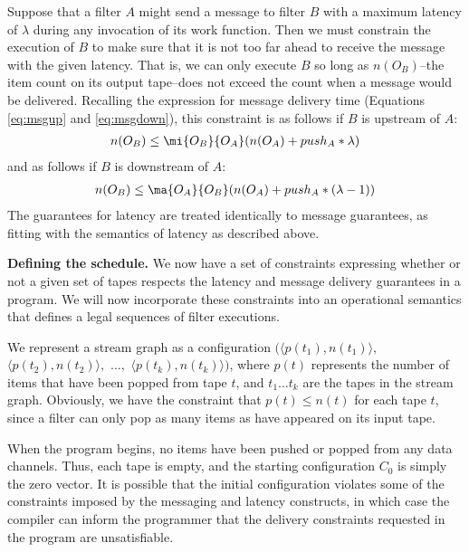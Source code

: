 Suppose that a filter $A$ might send a message to filter $B$ with a
maximum latency of $\lambda$ during any invocation of its work
function.  Then we must constrain the execution of $B$ to make sure
that it is not too far ahead to receive the message with the given
latency.  That is, we can only execute $B$ so long as $n(O_B)$--the
item count on its output tape--does not exceed the count when a
message would be delivered.  Recalling the expression for message
delivery time (Equations \ref{eq:msgup} and
\ref{eq:msgdown}), this constraint is as follows if $B$ is upstream of $A$:
\begin{align}
\label{eq:mc1}
n(O_B) \le \mi{O_B}{O_A}(n(O_A) + push_A * \lambda)
\end{align}
and as follows if $B$ is downstream of $A$:
\begin{align}
\label{eq:mc2}
n(O_B) \le \ma{O_A}{O_B}(n(O_A) + push_A * (\lambda-1))
\end{align}
The guarantees for latency are treated identically to message
guarantees, as fitting with the semantics of latency as described
above.

{\bf Defining the schedule.}  We now have a set of constraints
expressing whether or not a given set of tapes respects the latency
and message delivery guarantees in a program.  We will now
incorporate these constraints into an operational semantics that
defines a legal sequences of filter executions.  

We represent a stream graph as a configuration $(\langle p(t_1),
n(t_1) \rangle,$ $\langle p(t_2), n(t_2) \rangle,$ $\dots,$ $\langle
p(t_k), n(t_k) \rangle)$, where $p(t)$ represents the number of items
that have been popped from tape $t$, and $t_1
\dots t_k$ are the tapes in the stream graph.  Obviously, we have the
constraint that $p(t) \le n(t)$ for each tape $t$, since a filter can
only pop as many items as have appeared on its input tape.

When the program begins, no items have been pushed or popped from any
data channels.  Thus, each tape is empty, and the starting
configuration $C_0$ is simply the zero vector.  It is possible that
the initial configuration violates some of the constraints imposed by
the messaging and latency constructs, in which case the compiler can
inform the programmer that the delivery constraints requested in the
program are unsatisfiable.

